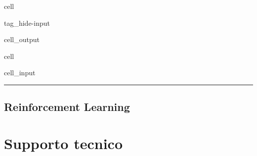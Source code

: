 \documentclass[letterpaper,10pt,italian]{jupyterBook}
\begin{document}
\begin{sphinxuseclass}{cell}
\begin{sphinxuseclass}{tag_hide-input}\begin{sphinxVerbatimOutput}

\begin{sphinxuseclass}{cell_output}
\noindent{}

\noindent{}

\end{sphinxuseclass}\end{sphinxVerbatimOutput}

\end{sphinxuseclass}
\end{sphinxuseclass}
\begin{sphinxuseclass}{cell}\begin{sphinxVerbatimInput}

\begin{sphinxuseclass}{cell_input}
\begin{sphinxVerbatim}[commandchars=\\\{\}]
\end{sphinxVerbatim}

\end{sphinxuseclass}\end{sphinxVerbatimInput}

\end{sphinxuseclass}

\bigskip\hrule\bigskip


\sphinxstepscope


\chapter{Reinforcement Learning}
\label{\detokenize{ch/ai/ml:reinforcement-learning}}\label{\detokenize{ch/ai/ml:ai-rl}}\label{\detokenize{ch/ai/ml::doc}}
\sphinxstepscope


\part{Supporto tecnico}

\sphinxstepscope
\end{document}
